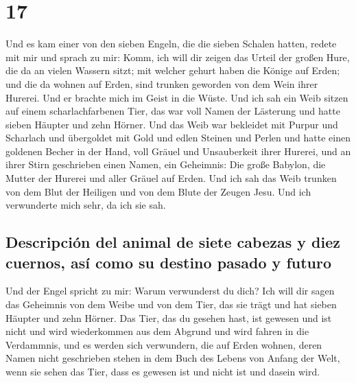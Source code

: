 \hypertarget{section-16}{%
\section{17}\label{section-16}}

 Und es kam einer von den sieben Engeln, die die sieben
Schalen hatten, redete mit mir und sprach zu mir: Komm, ich will dir
zeigen das Urteil der großen Hure, die da an vielen Wassern sitzt;
 mit welcher gehurt haben die Könige auf Erden; und die da
wohnen auf Erden, sind trunken geworden von dem Wein ihrer Hurerei.
 Und er brachte mich im Geist in die Wüste. Und ich sah
ein Weib sitzen auf einem scharlachfarbenen Tier, das war voll Namen der
Lästerung und hatte sieben Häupter und zehn Hörner.  Und
das Weib war bekleidet mit Purpur und Scharlach und übergoldet mit Gold
und edlen Steinen und Perlen und hatte einen goldenen Becher in der
Hand, voll Gräuel und Unsauberkeit ihrer Hurerei,  und an
ihrer Stirn geschrieben einen Namen, ein Geheimnis: Die große Babylon,
die Mutter der Hurerei und aller Gräuel auf Erden.  Und
ich sah das Weib trunken von dem Blut der Heiligen und von dem Blute der
Zeugen Jesu. Und ich verwunderte mich sehr, da ich sie sah.

\hypertarget{descripciuxf3n-del-animal-de-siete-cabezas-y-diez-cuernos-asuxed-como-su-destino-pasado-y-futuro}{%
\subsection{Descripción del animal de siete cabezas y diez cuernos, así
como su destino pasado y
futuro}\label{descripciuxf3n-del-animal-de-siete-cabezas-y-diez-cuernos-asuxed-como-su-destino-pasado-y-futuro}}

 Und der Engel spricht zu mir: Warum verwunderst du dich?
Ich will dir sagen das Geheimnis von dem Weibe und von dem Tier, das sie
trägt und hat sieben Häupter und zehn Hörner.  Das Tier,
das du gesehen hast, ist gewesen und ist nicht und wird wiederkommen aus
dem Abgrund und wird fahren in die Verdammnis, und es werden sich
verwundern, die auf Erden wohnen, deren Namen nicht geschrieben stehen
in dem Buch des Lebens von Anfang der Welt, wenn sie sehen das Tier,
dass es gewesen ist und nicht ist und dasein wird.

